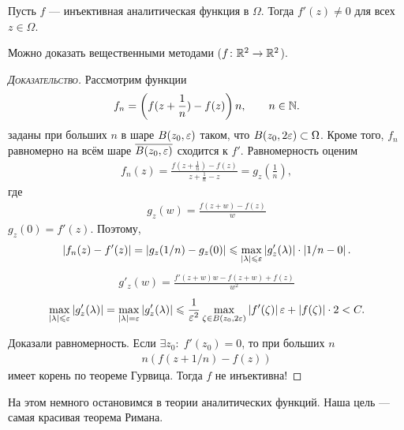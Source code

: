 \documentclass[../complex-analysis.tex]{subfiles}
\begin{document}
 \begin{thm}
  Пусть $ f $ --- инъективная аналитическая функция в $ \Omega $. Тогда $ f'(z) \neq 0 $ для всех $ z \in \Omega $.
 \end{thm}
 Можно доказать вещественными методами ($ f \colon \mathbb{R}^{2}\to\mathbb{R}^{2} $).
 \begin{proof}[\normalfont\textsc{Доказательство}]
  Рассмотрим функции
  \begin{align*}
   f_n = \left(f(z + \frac{1}{n}) - f(z) \right)n, \qquad n \in \mathbb{N}. 
\end{align*} заданы при больших $ n $ в шаре $ B(z_0, \varepsilon) $ таком, что $ B(z_0, 2\varepsilon) \subset \Omega $. Кроме того, $ f_n $ равномерно на всём шаре $ \overline {B(z_0,\varepsilon)} $ сходится к $ f' $. Равномерность оценим
  \begin{align*}
   f_n(z) = \frac{f\left(z + \frac{1}{n}\right) - f(z)}{z + \frac{1}{n} - z} = g_z \left( \frac{1}{n} \right),
  \end{align*} где \begin{align*}
   g_z(w) = \frac{f(z+w)-f(z)}{w}
  \end{align*} $ g_z(0) = f'(z) $. Поэтому,
  \begin{align*}
   \left|f_n(z) - f'(z) \right| = \left|g_z(1 / n) - g_z(0) \right| \leqslant \max_{\left| \lambda \right| \leqslant \varepsilon} \left| g'_z(\lambda) \right| \cdot \left| 1 / n - 0 \right|.
  \end{align*}
  \begin{align*}
   g'_z(w) = \frac{f'(z + w)w - f(z + w) + f(z)}{w^{2}}
  \end{align*}
  \begin{align*}
   \max_{\left| \lambda \right| \leqslant \varepsilon} \left| g'_z(\lambda) \right| = \max_{\left| \lambda \right|=\varepsilon} \left| g'_z(\lambda) \right| \leqslant \frac{1}{\varepsilon^{2}} \max_{\zeta \in B(z_0,2\varepsilon)} \left| f'(\zeta) \right| \varepsilon + \left| f(\zeta) \right| \cdot 2 < C.
  \end{align*}

  Доказали равномерность. Если $ \exists z_0 \colon\; f'(z_0) = 0  $, то при больших $ n $
  \begin{align*}
   n(f(z + 1 / n) - f(z))
  \end{align*} имеет корень по теореме Гурвица. Тогда $ f $ не инъективна!
 \end{proof}


 На этом немного остановимся в теории аналитических функций. Наша цель --- самая красивая теорема Римана.
\end{document}
